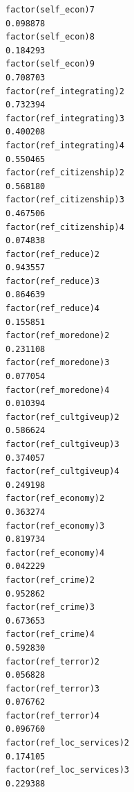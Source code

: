 \documentclass[
]{article}
\begin{document}
\begin{table}
\begin{minipage}[t]{\linewidth}
{\begin{verbatim}
factor(self_econ)7                                                                0.098878
factor(self_econ)8                                                                0.184293
factor(self_econ)9                                                                0.708703
factor(ref_integrating)2                                                          0.732394
factor(ref_integrating)3                                                          0.400208
factor(ref_integrating)4                                                          0.550465
factor(ref_citizenship)2                                                          0.568180
factor(ref_citizenship)3                                                          0.467506
factor(ref_citizenship)4                                                          0.074838
factor(ref_reduce)2                                                               0.943557
factor(ref_reduce)3                                                               0.864639
factor(ref_reduce)4                                                               0.155851
factor(ref_moredone)2                                                             0.231108
factor(ref_moredone)3                                                             0.077054
factor(ref_moredone)4                                                             0.010394
factor(ref_cultgiveup)2                                                           0.586624
factor(ref_cultgiveup)3                                                           0.374057
factor(ref_cultgiveup)4                                                           0.249198
factor(ref_economy)2                                                              0.363274
factor(ref_economy)3                                                              0.819734
factor(ref_economy)4                                                              0.042229
factor(ref_crime)2                                                                0.952862
factor(ref_crime)3                                                                0.673653
factor(ref_crime)4                                                                0.592830
factor(ref_terror)2                                                               0.056828
factor(ref_terror)3                                                               0.076762
factor(ref_terror)4                                                               0.096760
factor(ref_loc_services)2                                                         0.174105
factor(ref_loc_services)3                                                         0.229388

\end{verbatim}}
\end{minipage}
\end{table}
\end{document}
